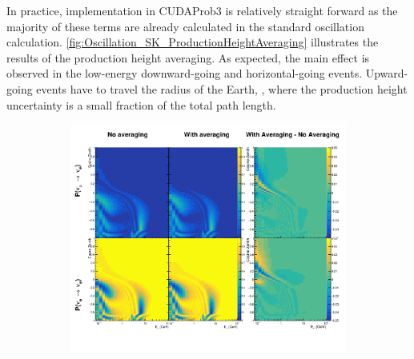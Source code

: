 In practice, implementation in CUDAProb3 \cite{cudaprob3} is relatively straight forward as the majority of these terms are already calculated in the standard oscillation calculation. \autoref{fig:Oscillation_SK_ProductionHeightAveraging} illustrates the results of the production height averaging. As expected, the main effect is observed in the low-energy downward-going and horizontal-going events. Upward-going events have to travel the radius of the Earth, , where the production height uncertainty is a small fraction of the total path length. 

\begin{figure}[h]
  \begin{subfigure}[t]{\textwidth}
    \includegraphics[width=\textwidth, trim={0mm 0mm 0mm 0mm}, clip,page=1]{Figures/Oscillation/ProductionHeightAveraging.pdf}
  \end{subfigure}
  \caption{}
  \label{fig:Oscillation_SK_ProductionHeightAveraging}
\end{figure}
